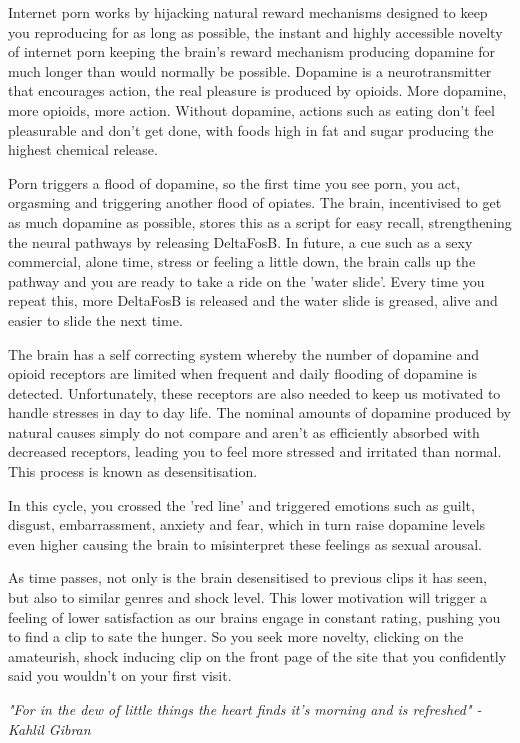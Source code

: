 \documentclass[easypeasy.tex]{subfiles}
\begin{document}
Internet porn works by hijacking natural reward mechanisms designed to keep you reproducing for as long as possible, the instant and highly accessible novelty of internet porn keeping the brain's reward mechanism producing dopamine for much longer than would normally be possible. Dopamine is a neurotransmitter that encourages action, the real pleasure is produced by opioids. More dopamine, more opioids, more action. Without dopamine, actions such as eating don't feel pleasurable and don't get done, with foods high in fat and sugar producing the highest chemical release.

Porn triggers a flood of dopamine, so the first time you see porn, you act, orgasming and triggering another flood of opiates. The brain, incentivised to get as much dopamine as possible, stores this as a script for easy recall, strengthening the neural pathways by releasing DeltaFosB. In future, a cue such as a sexy commercial, alone time, stress or feeling a little down, the brain calls up the pathway and you are ready to take a ride on the 'water slide'. Every time you repeat this, more DeltaFosB is released and the water slide is greased, alive and easier to slide the next time.

The brain has a self correcting system whereby the number of dopamine and opioid receptors are limited when frequent and daily flooding of dopamine is detected. Unfortunately, these receptors are also needed to keep us motivated to handle stresses in day to day life. The nominal amounts of dopamine produced by natural causes simply do not compare and aren't as efficiently absorbed with decreased receptors, leading you to feel more stressed and irritated than normal. This process is known as desensitisation.

In this cycle, you crossed the 'red line' and triggered emotions such as guilt, disgust, embarrassment, anxiety and fear, which in turn raise dopamine levels even higher causing the brain to misinterpret these feelings as sexual arousal.

As time passes, not only is the brain desensitised to previous clips it has seen, but also to similar genres and shock level. This lower motivation will trigger a feeling of lower satisfaction as our brains engage in constant rating, pushing you to find a clip to sate the hunger. So you seek more novelty, clicking on the amateurish, shock inducing clip on the front page of the site that you confidently said you wouldn't on your first visit.

\textit{"For in the dew of little things the heart finds it's morning and is refreshed" - Kahlil Gibran}
\end{document}
